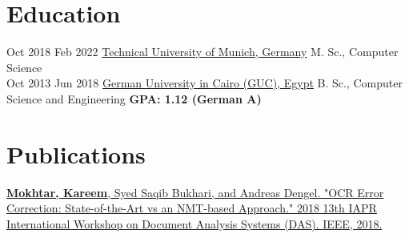 \documentclass[letterpaper]{twentysecondcv} %
\begin{document}
    \makeprofile %
    
    \section{Education}
    \begin{twenty} %
    	\twentyitem
        	{Oct 2018}
                {Feb 2022}
            {\href{https://www.tum.de/}{Technical University of Munich, Germany}}
            {}
            {M. Sc., Computer Science}
            {\\}
    	\twentyitem
        	{Oct 2013}
    		{Jun 2018}
            {\href{http://www.guc.edu.eg/}{German University in Cairo (GUC), Egypt}}
            {}
            {B. Sc., Computer Science and Engineering \textbf{ GPA: 1.12 (German A)}}
    \end{twenty}
    
    \section{Publications}
    \href{https://ieeexplore.ieee.org/abstract/document/8395234}{\textbf{Mokhtar, Kareem}, Syed Saqib Bukhari, and Andreas Dengel. "OCR Error Correction: State-of-the-Art vs an NMT-based Approach." 2018 13th IAPR International Workshop on Document Analysis Systems (DAS). IEEE, 2018.}

    
    
\end{document}
